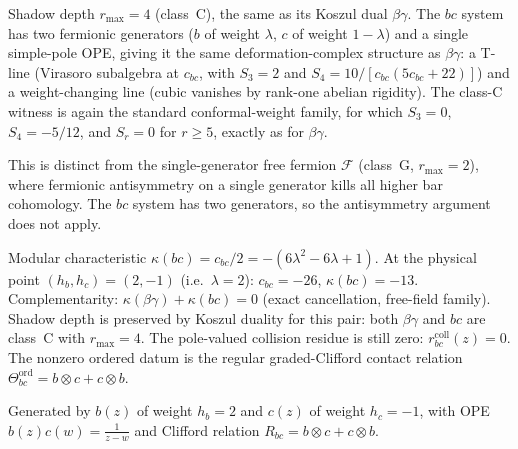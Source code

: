 \begin{remark}
\label{rem:bc-shadow-archetype}
Shadow depth $r_{\max} = 4$ (class~C), the same as its Koszul dual
$\beta\gamma$. The $bc$ system has two fermionic generators ($b$ of
weight $\lambda$, $c$ of weight $1 - \lambda$) and a single
simple-pole OPE, giving it the same deformation-complex structure as
$\beta\gamma$: a T-line (Virasoro subalgebra at $c_{bc}$, with
$S_3 = 2$ and $S_4 = 10/[c_{bc}(5c_{bc}+22)]$) and a
weight-changing line (cubic vanishes by rank-one abelian rigidity).
The class-C witness is again the standard conformal-weight family,
for which $S_3 = 0$, $S_4 = -5/12$, and $S_r = 0$ for $r \ge 5$,
exactly as for $\beta\gamma$.

This is distinct from the single-generator free fermion
$\mathcal{F}$ (class~G, $r_{\max} = 2$), where fermionic
antisymmetry on a single generator kills all higher bar cohomology.
The $bc$ system has two generators, so the antisymmetry argument
does not apply.

Modular characteristic $\kappa(bc) = c_{bc}/2 = -(6\lambda^2 - 6\lambda + 1)$.
At the physical point $(h_b, h_c) = (2, -1)$ (i.e.\ $\lambda = 2$):
$c_{bc} = -26$, $\kappa(bc) = -13$.
Complementarity:
$\kappa(\beta\gamma) + \kappa(bc) = 0$ (exact cancellation, free-field family).
Shadow depth is preserved by Koszul duality for this pair: both
$\beta\gamma$ and $bc$ are class~C with $r_{\max} = 4$.
The pole-valued collision residue is still zero:
$r^{\mathrm{coll}}_{bc}(z)=0$. The nonzero ordered datum is the
regular graded-Clifford contact relation
$\Theta_{bc}^{\mathrm{ord}}=b\otimes c+c\otimes b$.
\end{remark}

\begin{definition}
Generated by $b(z)$ of weight $h_b = 2$ and $c(z)$ of weight $h_c = -1$,
with OPE $b(z)c(w) = \frac{1}{z-w}$ and Clifford relation $R_{bc} = b \otimes c + c \otimes b$.
\end{definition}

